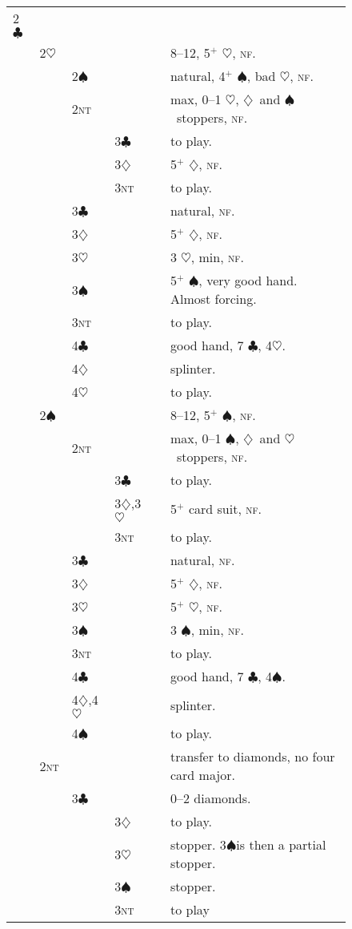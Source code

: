 \documentclass{report}
\newcommand{\nf}{\textsc{nf}}
\renewcommand{\c}{\ensuremath{\clubsuit}}
\renewcommand{\d}{\ensuremath{\diamondsuit}}
\newcommand{\h}{\ensuremath{\heartsuit}}
\newcommand{\s}{\ensuremath{\spadesuit}}
\newcommand{\nt}{\textsc{nt}}
\newcommand{\+}{\ensuremath{^+}}
\begin{document}
\begin{figure}[ht]
\begin{tabular}{llllll}
2\c\\
&2\h &&&& 8--12, 5\+ \h, \nf.\\
&    &2\s &&& natural, 4\+ \s, bad \h, \nf.\\
&    &2\nt&&& max, 0--1 \h, \d\ and \s\ stoppers, \nf.\\
&    &    &3\c&& to play.\\
&    &    &3\d&& 5\+ \d, \nf.\\
&    &    &3\nt&& to play.\\
&    &3\c&&& natural, \nf.\\
&    &3\d&&& 5\+ \d, \nf.\\
&    &3\h&&& 3 \h, min, \nf.\\
&    &3\s&&& 5\+ \s, very good hand.  Almost forcing.\\
&    &3\nt&&& to play.\\
&    &4\c&&& good hand, 7 \c, 4\h.\\
&    &4\d&&& splinter.\\
&    &4\h&&& to play.\\
&2\s &&&& 8--12, 5\+ \s, \nf.\\
&    &2\nt&&& max, 0--1 \s, \d\ and \h\ stoppers, \nf.\\
&    &    &3\c&& to play.\\
&    &    &3\d,3\h&& 5\+ card suit, \nf.\\
&    &    &3\nt&& to play.\\
&    &3\c&&& natural, \nf.\\
&    &3\d&&& 5\+ \d, \nf.\\
&    &3\h&&& 5\+ \h, \nf.\\
&    &3\s&&& 3 \s, min, \nf.\\
&    &3\nt&&& to play.\\
&    &4\c&&& good hand, 7 \c, 4\s.\\
&    &4\d,4\h&&& splinter.\\
&    &4\s&&& to play.\\
&2\nt&&&&transfer to diamonds, no four card major.\\
&    &3\c &&& 0--2 diamonds.\\
&    &    &3\d && to play.\\
&    &    &3\h && stopper.  3\s is then a partial stopper.\\
&    &    &3\s && stopper.\\
&    &    &3\nt&&to play\\

\end{tabular}
\end{figure}
\end{document}
